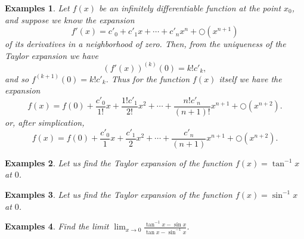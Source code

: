 \documentclass[a4paper,12pt]{article} %
\newtheorem{example}{Examples}
\begin{document}
\begin{example}
    \normalfont 
    Let $f(x)$ be an infinitely differentiable function at the point 
    $x_0$, and suppose we know the expansion 
    \[
        f'(x) = c'_0 + c'_1x + \cdots + c'_nx^n + \bigcirc(x^{n+1})
        \]
    of its derivatives in a neighborhood of zero. Then, from the 
    uniqueness of the Taylor expansion we have 
    \[
        \left(f'(x)\right)^{(k)} (0) = k!c'_k,
        \]
    and so $\displaystyle f^{(k+1)}(0) = k!c'_k$. Thus for the function $f(x)$
    itself we have the expansion 
    \[
        f(x) = f(0) + \frac{c'_0}{1!}x + \frac{1!c'_1}{2!}x^2 + 
        \cdots + \frac{n!c'_n}{(n+1)!}x^{n+1} + \bigcirc(x^{n+2}).
        \]
    or, after simplication, 
    \[
        f(x) = f(0) + \frac{c'_0}{1}x + \frac{c'_1}{2}x^2 + 
        \cdots + \frac{c'_n}{(n+1)}x^{n+1} + \bigcirc(x^{n+2}).
        \]
\end{example}

\begin{example}
    \normalfont
    Let us find the Taylor expansion of the function $f(x) = \tan^{-1} x$
    at $0$.
\end{example}
\begin{example}
    \normalfont
    Let us find the Taylor expansion of the function $f(x) = \sin^{-1}x$
    at $0$.
\end{example}

\begin{example}
    \normalfont
    Find the limit $\displaystyle \lim_{x \to 0} \frac{\tan^{-1}x - \sin x}
    {\tan x - \sin^{-1}x}$.
\end{example}
\end{document}
